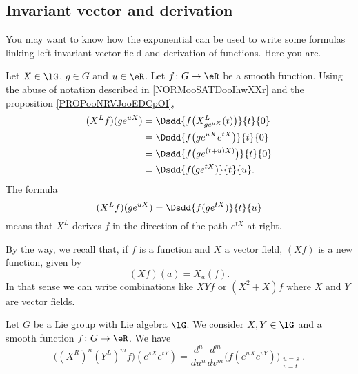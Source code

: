 \subsection{Invariant vector and derivation}

You may want to know how the exponential can be used to write some formulas linking left-invariant vector field and derivation of functions. Here you are.

\begin{normaltext}
    Let \( X\in \lG\), \( g\in G\) and \( u\in \eR\). Let \( f\colon G\to \eR\) be a smooth function. Using the abuse of notation described in \ref{NORMooSATDooIhwXXr} and the proposition \ref{PROPooNRVJooEDCpOI},
    \begin{subequations}
        \begin{align}
            (X^Lf)(g e^{uX})&=\Dsdd{ f\big( X^L_{g e^{uX}}(t) \big) }{t}{0}\\
            &=\Dsdd{ f\big( g e^{uX} e^{tX} \big) }{t}{0}\\
            &=\Dsdd{ f\big( g e^{(t+u)X)} \big)}{t}{0}\\
            &=\Dsdd{ f(g e^{tX}) }{t}{u}.
        \end{align}
    \end{subequations}
    The formula
    \begin{equation}
        (X^Lf)(g e^{uX})=\Dsdd{ f(g e^{tX}) }{t}{u}
    \end{equation}
    means that \( X^L\) derives \( f\) in the direction of the path \(  e^{tX}\) at right.
\end{normaltext}

\begin{normaltext}
    By the way, we recall that, if \( f\) is a function and \( X\) a vector field, \( (Xf)\) is a new function, given by
    \begin{equation}
        (Xf)(a)=X_a(f).
    \end{equation}
    In that sense we can write combinations like \( XYf\) or \( (X^2+X)f\) where \( X\) and \( Y\) are vector fields.
\end{normaltext}

\begin{proposition}       \label{PROPooKSIDooVIFkiM}
    Let \( G\) be a Lie group with Lie algebra \( \lG\). We consider \( X,Y\in \lG\) and a smooth function \( f\colon G\to \eR\). We have
    \begin{equation}
        \big( (X^R)^n(Y^L)^mf \big)( e^{sX} e^{tY})=\frac{ d^n }{ du^n }\frac{ d^m }{ dv^m }\Big( f( e^{uX} e^{vY}) \Big)_{\substack{u=s\\v=t}}.
    \end{equation}
\end{proposition}

